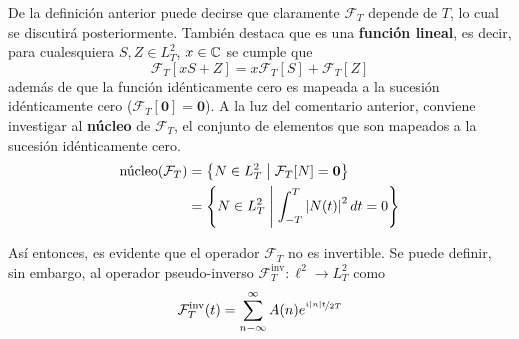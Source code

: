 %


De la definición anterior puede decirse que claramente $\mathcal{F}_T$ depende de $T$, lo cual se discutirá posteriormente.
%
También destaca que es una \textbf{función lineal}, es decir, para cualesquiera $S, Z \in L^{2}_T$, $x\in \mathbb{C}$ se cumple que
\begin{equation}
\mathcal{F}_T[xS + Z] = x\mathcal{F}_T[S] + \mathcal{F}_T[Z]
\end{equation}
además de que la función idénticamente cero es mapeada a la sucesión idénticamente cero ($\mathcal{F}_T[\boldsymbol{0}]=\boldsymbol{0}$).
%
A la luz del comentario anterior, conviene investigar al \textbf{núcleo} de $\mathcal{F}_T$, el conjunto de elementos que son mapeados a la sucesión idénticamente cero.
%
\begin{align}
\text{núcleo}(\mathcal{F}_T) &= \left\{ N\in L^{2}_T \mathrel{}\middle|\mathrel{} \mathcal{F}_T[N] = \boldsymbol{0}  \right\} \\
&= \left\{ N\in L^{2}_T \mathrel{}\middle|\mathrel{} \int_{- T }^{ T } \left| N(t) \right|^{2} dt = 0 \right\}
\end{align}

Así entonces, es evidente que el operador $\mathcal{F}_T$ no es invertible.
%
Se puede definir, sin embargo, al operador pseudo-inverso $\mathcal{F}_{T}^{\text{inv}} : \ell^{2} \rightarrow L^{2}_T$ como
\begin{equation}
\mathcal{F}_{T}^{\text{inv}}(t) = \sum_{n -\infty}^{\infty} A(n) e^{\nicefrac{i \left| n \right| t}{2 T}}
\end{equation}

